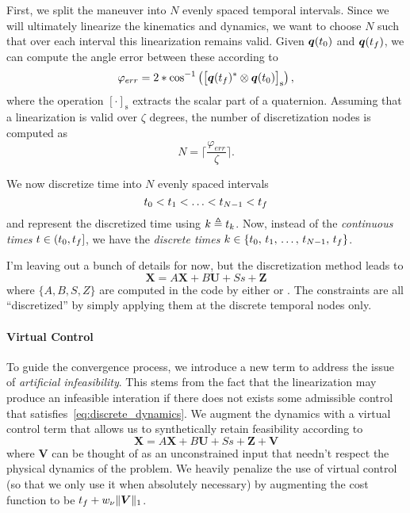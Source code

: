 \documentclass[12pt]{article}
\begin{document}
First, we split the maneuver into $N$ evenly spaced temporal intervals. Since we will ultimately linearize the kinematics and dynamics, we want to choose $N$ such that over each interval this linearization remains valid. Given $\bm{q}(t_0)$ and $\bm{q}(t_f)$, we can compute the angle error between these according to
\begin{equation}
\varphi_{err} = 2*\cos^{-1} \left( \big[ \bm{q}(t_f)^* \otimes \bm{q}(t_0) \big]_{\text{s}} \right),
\label{eq:err_angle}
\end{equation}
where the operation $[\cdot]_{\text{s}}$ extracts the scalar part of a quaternion. Assuming that a linearization is valid over $\zeta$ degrees, the number of discretization nodes is computed as 
\begin{equation}
N = \lceil \frac{\varphi_{err}}{\zeta} \rceil.
\label{eq:N}
\end{equation}

We now discretize time into $N$ evenly spaced intervals 
\begin{equation}
t_0 < t_1 < \ldots < t_{N-1} < t_f
\end{equation}
and represent the discretized time using $k \triangleq t_k$. Now, instead of the \textit{continuous times} $t\in(t_0,t_f]$, we have the \textit{discrete times} $k\in\{t_0,\,t_1,\,\ldots,\,t_{N-1},\,t_f\}$.

I'm leaving out a bunch of details for now, but the discretization method leads to
\begin{equation}
\bm{X} = A \bm{X} + B \bm{U} + S s + \bm{Z}
\label{eq:discrete_dynamics}
\end{equation}
where $\{A,B,S,Z\}$ are computed in the code by either  or . The constraints are all ``discretized'' by simply applying them at the discrete temporal nodes only. 

\paragraph{Virtual Control}

To guide the convergence process, we introduce a new term to address the issue of \textit{artificial infeasibility}. This stems from the fact that the linearization may produce an infeasible interation if there does not exists some admissible control that satisfies~\eqref{eq:discrete_dynamics}. We augment the dynamics with a virtual control term that allows us to synthetically retain feasibility according to
\begin{equation}
\bm{X} = A \bm{X} + B \bm{U} + S s + \bm{Z} + \bm{V}
\label{eq:VC_discrete_dynamics}
\end{equation}
where $\bm{V}$ can be thought of as an unconstrained input that needn't respect the physical dynamics of the problem. We heavily penalize the use of virtual control (so that we only use it when absolutely necessary) by augmenting the cost function to be $t_f + w_{\nu} \| \bm{V} \|_1$.
\end{document}
